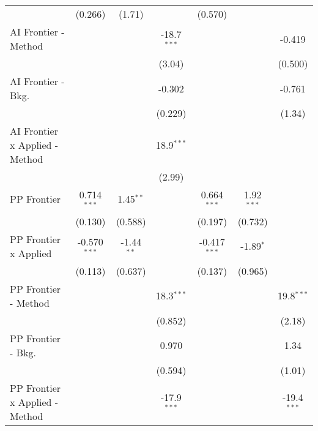 \begin{tabular}{lcccccc}
                                  & (0.266)        & (1.71)        &               & (0.570)        &              &   \\   
   AI Frontier - Method           &                &               & -18.7$^{***}$ &                &              & -0.419\\   
                                  &                &               & (3.04)        &                &              & (0.500)\\   
   AI Frontier - Bkg.             &                &               & -0.302        &                &              & -0.761\\   
                                  &                &               & (0.229)       &                &              & (1.34)\\   
   AI Frontier x Applied - Method &                &               & 18.9$^{***}$  &                &              &   \\   
                                  &                &               & (2.99)        &                &              &   \\   
   PP Frontier                    & 0.714$^{***}$  & 1.45$^{**}$   &               & 0.664$^{***}$  & 1.92$^{***}$ &   \\   
                                  & (0.130)        & (0.588)       &               & (0.197)        & (0.732)      &   \\   
   PP Frontier x Applied          & -0.570$^{***}$ & -1.44$^{**}$  &               & -0.417$^{***}$ & -1.89$^{*}$  &   \\   
                                  & (0.113)        & (0.637)       &               & (0.137)        & (0.965)      &   \\   
   PP Frontier - Method           &                &               & 18.3$^{***}$  &                &              & 19.8$^{***}$\\   
                                  &                &               & (0.852)       &                &              & (2.18)\\   
   PP Frontier - Bkg.             &                &               & 0.970         &                &              & 1.34\\   
                                  &                &               & (0.594)       &                &              & (1.01)\\   
   PP Frontier x Applied - Method &                &               & -17.9$^{***}$ &                &              & -19.4$^{***}$\\   

\end{tabular}
